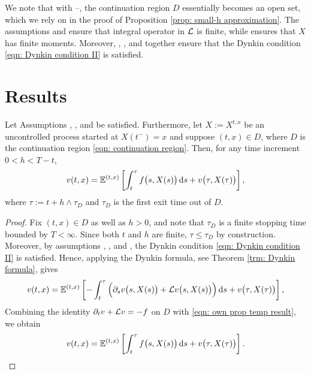 We note that with --, the continuation region $D$ essentially becomes an open set, which we rely on in the proof of Proposition \ref{prop: small-h approximation}. The assumptions  and  ensure that integral operator in $\mathcal{L}$ is finite, while  ensures that $X$ has finite moments. Moreover, , , and  together ensure that the Dynkin condition \eqref{eqn: Dynkin condition II} is satisfied.

\section{Results}
\label{appendix: results C}
\begin{proposition}
\label{prop: dynamic programming with h}
    Let Assumptions , , and  be satisfied. Furthermore, let $X:=X^{t,x}$ be an uncontrolled process started at $X(t^-)=x$ and suppose $(t,x) \in D$, where $D$ is the continuation region \eqref{eqn: continuation region}. Then, for any time increment $0<h<T-t$, 
    \begin{equation*}
        v(t,x) = \mathbb{E}^{(t,x)} \left[ \int_t^{\tau} f\big(s,X(s)\big) \,\mathrm{d} s + v\big(\tau, X(\tau)\big) \right],
    \end{equation*}
    where $\tau:=t + h \wedge \tau_D$ and $\tau_D$ is the first exit time out of $D$. 
\end{proposition}
\begin{proof}
    Fix $(t,x) \in D$ as well as $h>0$, and note that $\tau_D$ is a finite stopping time bounded by $T<\infty$. Since both $t$ and $h$ are finite, $\tau \leq \tau_D$ by construction. Moreover, by assumptions , , and , the Dynkin condition \eqref{eqn: Dynkin condition II} is satisfied. Hence, applying the Dynkin formula, see Theorem \ref{trm: Dynkin formula}, gives 
    \begin{equation}
        v(t,x) = \mathbb{E}^{(t,x)} \left[ - \int_t^\tau \Big(  \partial_s v\big(s,X(s)\big) + \mathcal{L} v\big(s,X(s)\big) \Big) \,\mathrm{d} s + v\big(\tau,X(\tau)\big) \right],
        \label{eqn: own prop temp result}
    \end{equation}
    Combining the identity $\partial_t v + \mathcal{L} v = -f$ on $D$ with \eqref{eqn: own prop temp result}, we obtain
    \begin{equation*}
        v(t,x) = \mathbb{E}^{(t,x)} \left[ \int_t^\tau f\big(s,X(s)\big)\,\mathrm{d} s + v\big( \tau,X(\tau)\big) \right].
        \qedhere
    \end{equation*}
\end{proof}

